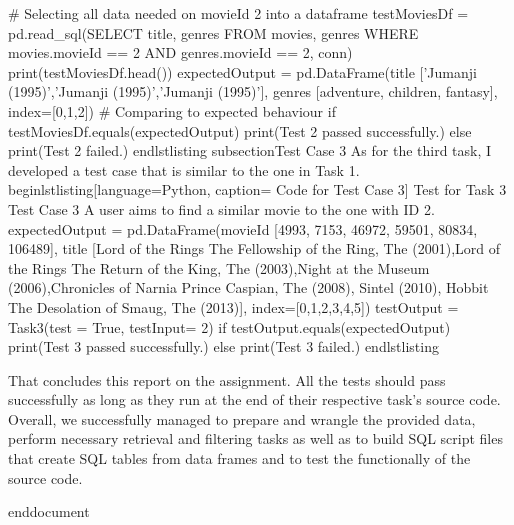 # Selecting all data needed on movieId 2 into a dataframe
testMoviesDf = pd.read_sql(SELECT title, genres FROM movies, genres WHERE movies.movieId == 2 AND genres.movieId == 2, conn)
print(testMoviesDf.head())
expectedOutput = pd.DataFrame({title ['Jumanji (1995)','Jumanji (1995)','Jumanji (1995)'], genres [adventure, children, fantasy]}, index=[0,1,2])
# Comparing to expected behaviour
if testMoviesDf.equals(expectedOutput)
        print(Test 2 passed successfully.)
else
        print(Test 2 failed.)
end{lstlisting}
subsection{Test Case 3}
As for the third  task, I developed a test case that is similar to  the one in Task 1.
begin{lstlisting}[language=Python, caption= Code for Test Case 3]
 Test for Task 3 
Test Case 3 A user aims to find a similar movie to the one with ID 2. 
expectedOutput = pd.DataFrame({movieId [4993, 7153, 46972, 59501, 80834, 106489], title [Lord of the Rings The Fellowship of the Ring, The (2001),Lord of the Rings The Return of the King, The (2003),Night at the Museum (2006),Chronicles of Narnia Prince Caspian, The (2008), Sintel (2010), Hobbit The Desolation of Smaug, The (2013)]}, index=[0,1,2,3,4,5])
testOutput = Task3(test = True, testInput= 2)
if testOutput.equals(expectedOutput)
        print(Test 3 passed successfully.)
else
        print(Test 3 failed.)
end{lstlisting}
 
That concludes this report on the assignment. All the tests should pass successfully as long as they run at the end of their respective task's source  code. Overall, we successfully managed to prepare and wrangle the provided data, perform necessary retrieval and  filtering tasks as well as to build  SQL script files that create SQL tables from data frames and to test the functionally of the source code.

end{document}